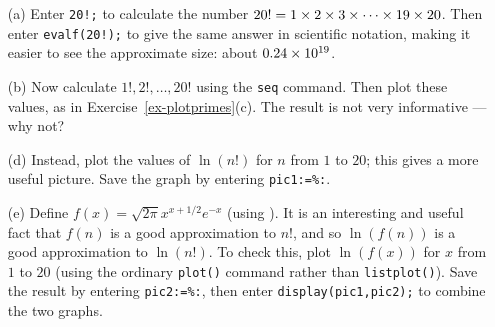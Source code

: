\documentclass[a4paper,10pt]{amsbook}
\numberwithin{example}{chapter}
\begin{document}
\begin{exercise}
 \begin{itemize}
  \item[(a)] Enter \verb~20!;~ to calculate the number
   $20!=1\times 2\times 3\times\dotsb\times 19\times 20$.  Then enter
   \verb~evalf(20!);~ to give the same answer in scientific notation,
   making it easier to see the approximate size: about
   $0.24\times 10^{19}$. 
  \item[(b)] Now calculate $1!,2!,\dotsc,20!$ using the
   \verb~seq~ command.  Then plot these values, as
   in Exercise~\ref{ex-plotprimes}(c). 
   The result is not very informative --- why not? 
  \item[(d)] Instead, plot the values of $\ln(n!)$ for $n$ from $1$ to
   $20$; this gives a more useful picture.  Save the graph by entering
   \verb~pic1:=%:~.  
  \item[(e)] Define $f(x)=\sqrt{2\pi} x^{x+1/2} e^{-x}$
   (using \note{\NOTEarrow}).  It is an
   interesting and useful fact that $f(n)$ is a good approximation to
   $n!$, and so $\ln(f(n))$ is a good approximation to $\ln(n!)$.  To
   check this, plot $\ln(f(x))$ for $x$ from $1$ to $20$ (using the
   ordinary \verb~plot()~ command rather than \verb~listplot()~). 
   Save the result by entering \verb~pic2:=%:~,
   then enter \verb~display(pic1,pic2);~ to combine the two graphs. 
 \end{itemize}
\end{exercise}
\end{document}
